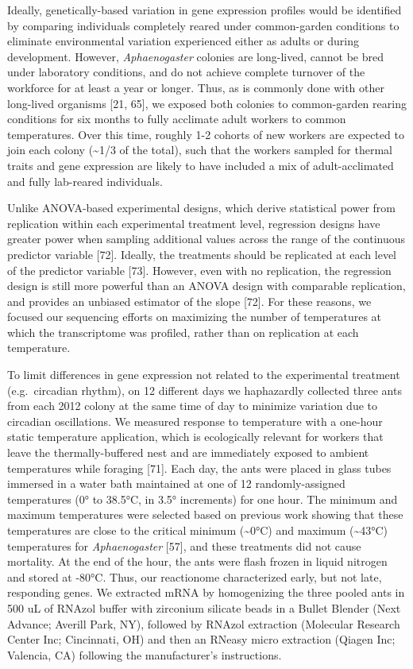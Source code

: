 \documentclass[]{article}
\begin{document}
Ideally, genetically-based variation in gene expression profiles would
be identified by comparing individuals completely reared under
common-garden conditions to eliminate environmental variation
experienced either as adults or during development. However,
\emph{Aphaenogaster} colonies are long-lived, cannot be bred under
laboratory conditions, and do not achieve complete turnover of the
workforce for at least a year or longer. Thus, as is commonly done with
other long-lived organisms {[}21, 65{]}, we exposed both colonies to
common-garden rearing conditions for six months to fully acclimate adult
workers to common temperatures. Over this time, roughly 1-2 cohorts of
new workers are expected to join each colony (\textasciitilde{}1/3 of
the total), such that the workers sampled for thermal traits and gene
expression are likely to have included a mix of adult-acclimated and
fully lab-reared individuals.

Unlike ANOVA-based experimental designs, which derive statistical power
from replication within each experimental treatment level, regression
designs have greater power when sampling additional values across the
range of the continuous predictor variable {[}72{]}. Ideally, the
treatments should be replicated at each level of the predictor variable
{[}73{]}. However, even with no replication, the regression design is
still more powerful than an ANOVA design with comparable replication,
and provides an unbiased estimator of the slope {[}72{]}. For these
reasons, we focused our sequencing efforts on maximizing the number of
temperatures at which the transcriptome was profiled, rather than on
replication at each temperature.

To limit differences in gene expression not related to the experimental
treatment (e.g.~circadian rhythm), on 12 different days we haphazardly
collected three ants from each 2012 colony at the same time of day to
minimize variation due to circadian oscillations. We measured response
to temperature with a one-hour static temperature application, which is
ecologically relevant for workers that leave the thermally-buffered nest
and are immediately exposed to ambient temperatures while foraging
{[}71{]}. Each day, the ants were placed in glass tubes immersed in a
water bath maintained at one of 12 randomly-assigned temperatures (0° to
38.5°C, in 3.5° increments) for one hour. The minimum and maximum
temperatures were selected based on previous work showing that these
temperatures are close to the critical minimum (\textasciitilde{}0°C)
and maximum (\textasciitilde{}43°C) temperatures for
\emph{Aphaenogaster} {[}57{]}, and these treatments did not cause
mortality. At the end of the hour, the ants were flash frozen in liquid
nitrogen and stored at -80°C. Thus, our reactionome characterized early,
but not late, responding genes. We extracted mRNA by homogenizing the
three pooled ants in 500 uL of RNAzol buffer with zirconium silicate
beads in a Bullet Blender (Next Advance; Averill Park, NY), followed by
RNAzol extraction (Molecular Research Center Inc; Cincinnati, OH) and
then an RNeasy micro extraction (Qiagen Inc; Valencia, CA) following the
manufacturer's instructions.
\end{document}
